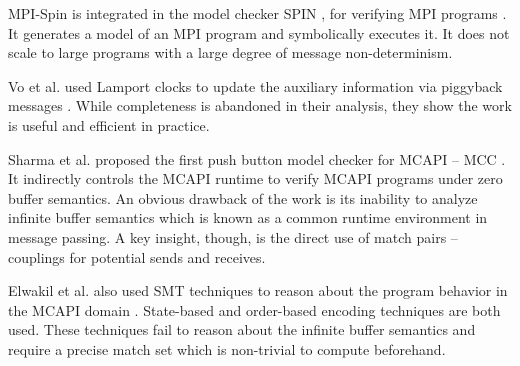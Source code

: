 MPI-Spin is integrated in the model checker SPIN \cite{DBLP:journals/tse/Holzmann97}, for verifying MPI programs \cite{DBLP:conf/vmcai/Siegel07,DBLP:conf/pvm/Siegel07}. It generates a model of an MPI program and symbolically executes it. It does not scale to large programs with a large degree of message non-determinism.

Vo et al. used Lamport clocks to update the auxiliary information via piggyback messages \cite{DBLP:conf/sc/VoAGSSB10,DBLP:conf/IEEEpact/VoGKSSB11}. While completeness is abandoned in their analysis, they show the work is useful and efficient in practice. 

Sharma et al. proposed the first push button model checker for MCAPI -- MCC \cite{DBLP:conf/fmcad/SharmaGMH09}. It indirectly controls the MCAPI runtime to verify MCAPI programs under zero buffer semantics. An obvious drawback of the work is its inability to analyze infinite buffer semantics which is known as a common runtime environment in message passing. A key insight, though, is the direct use of match pairs -- couplings for potential sends and receives.

Elwakil et al. also used SMT techniques to reason about the program behavior in the MCAPI domain \cite{DBLP:conf/issta/ElwakilY10,DBLP:conf/atva/ElwakilYW10}. State-based and order-based encoding techniques are both used. These techniques fail to reason about the infinite buffer semantics and require a precise match set which is non-trivial to compute beforehand.

